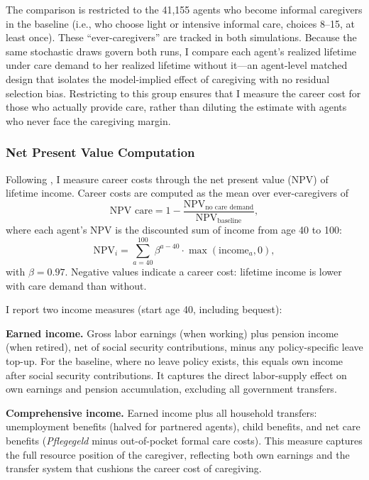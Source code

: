 The comparison is restricted to the 41,155 agents who become informal caregivers in the baseline (i.e., who choose light or intensive informal care, choices 8--15, at least once). These ``ever-caregivers'' are tracked in both simulations. Because the same stochastic draws govern both runs, I compare each agent's realized lifetime under care demand to her realized lifetime without it---an agent-level matched design that isolates the model-implied effect of caregiving with no residual selection bias. Restricting to this group ensures that I measure the career cost for those who actually provide care, rather than diluting the estimate with agents who never face the caregiving margin.

\subsubsection{Net Present Value Computation}

Following \citet{adda_career_2017}, I measure career costs through the net present value (NPV) of lifetime income. Career costs are computed as the mean over ever-caregivers of
\begin{equation}
  \text{NPV care} = 1 - \frac{\text{NPV}_{\text{no care demand}}}{\text{NPV}_{\text{baseline}}},
\end{equation}
where each agent's NPV is the discounted sum of income from age 40 to 100:
\begin{equation}
  \text{NPV}_i = \sum_{a=40}^{100} \beta^{a-40} \cdot \max(\text{income}_a, 0),
\end{equation}
with $\beta = 0.97$. Negative values indicate a career cost: lifetime income is lower with care demand than without.

I report two income measures (start age 40, including bequest):

\textbf{Earned income.} Gross labor earnings (when working) plus pension income (when retired), net of social security contributions, minus any policy-specific leave top-up. For the baseline, where no leave policy exists, this equals own income after social security contributions. It captures the direct labor-supply effect on own earnings and pension accumulation, excluding all government transfers.

\textbf{Comprehensive income.} Earned income plus all household transfers: unemployment benefits (halved for partnered agents), child benefits, and net care benefits (\textit{Pflegegeld} minus out-of-pocket formal care costs). This measure captures the full resource position of the caregiver, reflecting both own earnings and the transfer system that cushions the career cost of caregiving.

